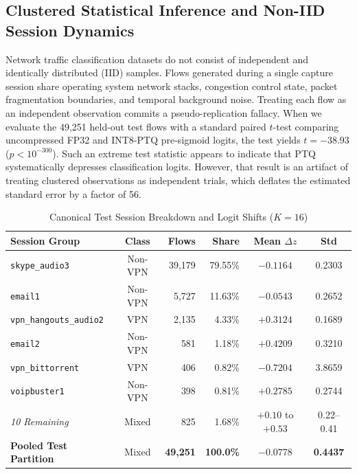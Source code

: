\documentclass[conference]{IEEEtran}
\begin{document}
\subsection{Clustered Statistical Inference and Non-IID Session Dynamics}

Network traffic classification datasets do not consist of independent and identically distributed (IID) samples. Flows generated during a single capture session share operating system network stacks, congestion control state, packet fragmentation boundaries, and temporal background noise. Treating each flow as an independent observation commits a pseudo-replication fallacy. When we evaluate the 49,251 held-out test flows with a standard paired $t$-test comparing uncompressed FP32 and INT8-PTQ pre-sigmoid logits, the test yields $t = -38.93$ ($p < 10^{-300}$). Such an extreme test statistic appears to indicate that PTQ systematically depresses classification logits. However, that result is an artifact of treating clustered observations as independent trials, which deflates the estimated standard error by a factor of 56.

\begin{table}[htbp]
\caption{Canonical Test Session Breakdown and Logit Shifts ($K=16$)}
\label{tab:session_shifts}
\centering
\scriptsize
\setlength{\tabcolsep}{2pt}
\begin{tabular}{lcrrcc}
\toprule
\textbf{Session Group} & \textbf{Class} & \textbf{Flows} & \textbf{Share} & \textbf{Mean $\Delta z$} & \textbf{Std} \\
\midrule
\texttt{skype\_audio3} & Non-VPN & 39,179 & 79.55\% & $-0.1164$ & 0.2303 \\
\texttt{email1} & Non-VPN & 5,727 & 11.63\% & $-0.0543$ & 0.2652 \\
\texttt{vpn\_hangouts\_audio2} & VPN & 2,135 & 4.33\% & $+0.3124$ & 0.1689 \\
\texttt{email2} & Non-VPN & 581 & 1.18\% & $+0.4209$ & 0.3210 \\
\texttt{vpn\_bittorrent} & VPN & 406 & 0.82\% & $-0.7204$ & 3.8659 \\
\texttt{voipbuster1} & Non-VPN & 398 & 0.81\% & $+0.2785$ & 0.2744 \\
\textit{10 Remaining} & Mixed & 825 & 1.68\% & $+0.10$ to $+0.53$ & 0.22--0.41 \\
\midrule
\textbf{Pooled Test Partition} & Mixed & \textbf{49,251} & \textbf{100.0\%} & \textbf{$-0.0778$} & \textbf{0.4437} \\
\bottomrule
\end{tabular}
\end{table}
\end{document}
